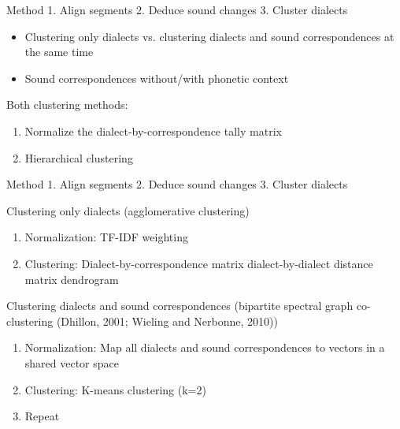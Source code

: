 \documentclass[xcolor={dvipsnames}]{beamer}
\begin{document}
\begin{frame}[t]{Method}{}
{ { 1.} Align segments \hspace{0.5em} { 2.} Deduce sound changes} \hspace{0.5em} { 3.} Cluster dialects

\vspace{2em}
\begin{itemize}
    \item Clustering only dialects vs. clustering dialects and sound correspondences at the same time
    \item Sound correspondences without/with phonetic context
\end{itemize}

\pause
\vspace{2em}
Both clustering methods:
\begin{enumerate}
    \item Normalize the dialect-by-correspondence tally matrix
    \item Hierarchical clustering
\end{enumerate}
\end{frame}

\begin{frame}[t]{Method}{}
{ { 1.} Align segments \hspace{0.5em} { 2.} Deduce sound changes} \hspace{0.5em} { 3.} Cluster dialects

\vspace{2em}
Clustering only dialects (agglomerative clustering)
\begin{enumerate}
    \item Normalization: TF-IDF weighting
    \item Clustering:
    Dialect-by-correspondence matrix \faArrowRight{} dialect-by-dialect distance matrix
        \faArrowRight{} dendrogram
\end{enumerate}

\pause
\vspace{2em}
Clustering dialects and sound correspondences (bipartite spectral graph co-clustering (Dhillon, 2001; Wieling and Nerbonne, 2010))

\begin{enumerate}
    \item Normalization: Map all dialects and sound correspondences to vectors in a shared vector space
    \item Clustering: K-means clustering (k=2)
    \item Repeat
\end{enumerate}
\end{frame}
\end{document}
